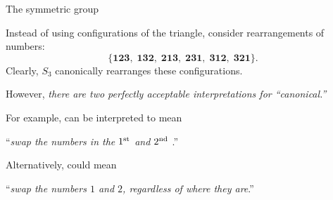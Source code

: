 \documentclass[8pt, handout]{beamer}
\newcommand{\Pause}{}
\begin{document}
\begin{frame}{The symmetric group} %

  Instead of using configurations of the triangle, consider
  rearrangements of numbers:
  \[
  \big\{\textbf{123},\;\textbf{132},\;\textbf{213},\;\textbf{231},\;
  \textbf{312},\;\textbf{321}\big\}.
  \]
  \Pause Clearly, $S_3$ canonically rearranges these
  configurations. \medskip\Pause
  
  However, \emph{there are two perfectly acceptable interpretations for 
    ``canonical.''} \medskip\pause
  
  For example,  can be interpreted to mean
  \begin{center}
    ``\emph{swap the numbers in the $1^{\rm st}$ and $2^{\rm nd}$
      }.''
  \end{center}
  \pause Alternatively,  could mean
  \begin{center}
    ``\emph{swap the {\color{xPurple}numbers} $1$ and $2$, regardless
      of where they are}.''
  \end{center}
  
  \vspace{-6mm}\pause
  

\end{frame}
\end{document}
